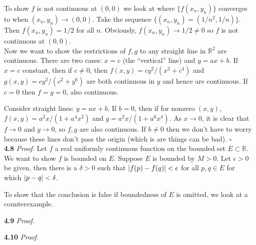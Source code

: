 \documentclass[11pt]{article}
\begin{document}
To show $f$ is not continuous at $(0,0)$ we look at where $\{ f(x_n,y_n)\}$ converges to when $(x_n,y_n) \to (0,0)$. Take the sequence $\{ (x_n,y_n) = (1/n^2,1/n) \}$. Then $f(x_n,y_n) = 1/2$ for all $n$. Obviously, $f(x_n,y_n) \to 1/2 \neq 0$ so $f$ is not continuous at $(0,0)$. \\

Now we want to show the restrictions of $f,g$ to any straight line in $\mathbb{R}^2$ are continuous. There are two cases: $x=c$ (the ``vertical'' line) and $y = ax+b$.  If $x=c$ constant, then if $c\neq 0$, then $f(x,y) = cy^2 / (x^2 + c^4)$ and $g(x,y) = cy^2 / (c^2 + y^6)$ are both continuous in $y$ and hence are continuous. If $c = 0$ then $f = g = 0$, also continuous. 

Consider straight lines: $y = ax + b$. If $b = 0$, then if for nonzero $(x,y)$, $f(x,y) = a^2x / (1 + a^4x^2)$ and $g = a^2x / (1 + a^6 x^4)$. As $x\to 0$, it is clear that $f \to 0$ and $g\to 0$, so $f,g$ are also continuous. If $b\neq 0$ then we don't have to worry because these lines don't pass the origin (which is are things can be bad). \hfill $\square$\\





\noindent \textbf{4.8}   
\noindent \textit{Proof.} Let $f$ a real uniformly continuous function on the bounded set $E \subset \mathbb{R}$. We want to show $f$ is bounded on $E$. Suppose $E$ is bounded by $M > 0$. Let $\epsilon > 0$ be given, then there is a $\delta > 0$ such that $\abs{f(p) - f(q)} < \epsilon$ for all $p,q\in E$ for which $\abs{p-q} < \delta$.  
 

To show that the conclusion is false if boundedness of $E$ is omitted, we look at a counterexample. 



\noindent \textbf{4.9}   
\noindent \textit{Proof.} 






\noindent \textbf{4.10}   
\noindent \textit{Proof.} 


  
\end{document}
